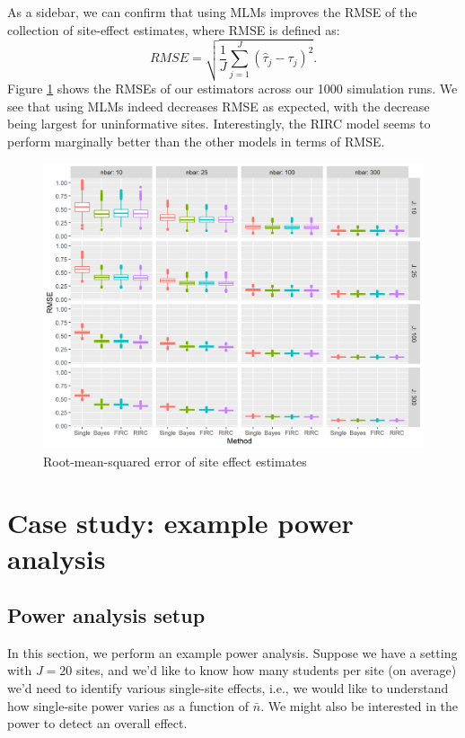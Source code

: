 \documentclass[]{article}
\begin{document}
As a sidebar, we can confirm that using MLMs improves the RMSE of the collection of site-effect estimates, where RMSE is defined as:
$$RMSE = \sqrt{\frac{1}{J} \sum_{j=1}^J (\hat{\tau}_j - \tau_j)^2}.$$
Figure \ref{fig:rmse_plot} shows the RMSEs of our estimators across our 1000 simulation runs.
We see that using MLMs indeed decreases RMSE as expected, with the decrease being largest for uninformative sites.
Interestingly, the RIRC model seems to perform marginally better than the other models in terms of RMSE.

\begin{figure}[ht]
	\centering
	\includegraphics[width=\textwidth]{rmse_plot}
	\caption{Root-mean-squared error of site effect estimates}
	\label{fig:rmse_plot}
\end{figure}

\section{Case study: example power analysis}

\subsection{Power analysis setup}

In this section, we perform an example power analysis.
Suppose we have a setting with $J=20$ sites, and we'd like to know how many students per site (on average) we'd need to identify various single-site effects, i.e., we would like to understand how single-site power varies as a function of $\bar{n}$.
We might also be interested in the power to detect an overall effect.
\end{document}
